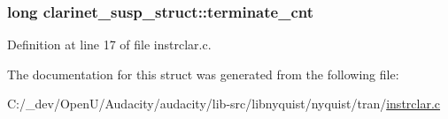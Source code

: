 \subsubsection[{\texorpdfstring{terminate\+\_\+cnt}{terminate_cnt}}]{\setlength{\rightskip}{0pt plus 5cm}long clarinet\+\_\+susp\+\_\+struct\+::terminate\+\_\+cnt}\hypertarget{structclarinet__susp__struct_a1db922d73ab5a3fc1b3f6059ac023b86}{}\label{structclarinet__susp__struct_a1db922d73ab5a3fc1b3f6059ac023b86}


Definition at line 17 of file instrclar.\+c.



The documentation for this struct was generated from the following file\+:\begin{DoxyCompactItemize}
\item 
C\+:/\+\_\+dev/\+Open\+U/\+Audacity/audacity/lib-\/src/libnyquist/nyquist/tran/\hyperlink{instrclar_8c}{instrclar.\+c}\end{DoxyCompactItemize}
